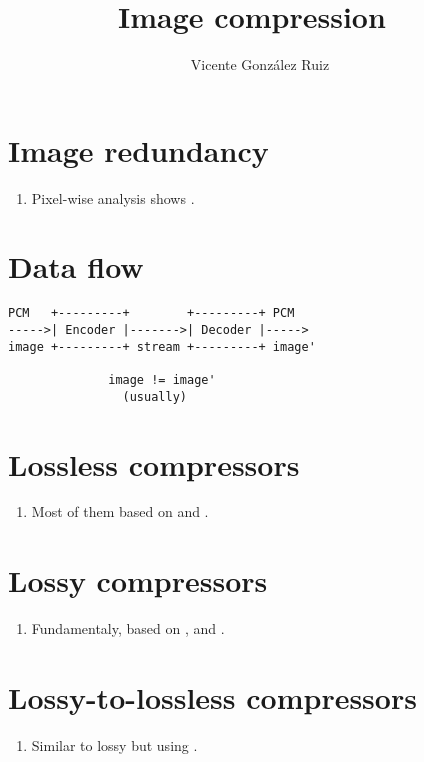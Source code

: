 \title{Image compression~\cite{1991.rabbani}}
\author{Vicente González Ruiz}
\maketitle
\tableofcontents

\section{Image redundancy}
\begin{enumerate}
\item Pixel-wise analysis shows .
\end{enumerate}

\section{Data flow~\cite{sayood2017introduction}}

\begin{verbatim}
PCM   +---------+        +---------+ PCM
----->| Encoder |------->| Decoder |----->
image +---------+ stream +---------+ image'

              image != image'
                (usually)
\end{verbatim}

\section{Lossless compressors}
\begin{enumerate}
\item Most of them based on  and .
\end{enumerate}

\section{Lossy compressors}
\begin{enumerate}
\item Fundamentaly, based on , 
  and .
\end{enumerate}

\section{Lossy-to-lossless compressors}
\begin{enumerate}
\item Similar to lossy but using
  .
\end{enumerate}

